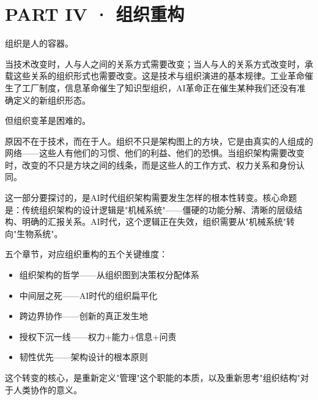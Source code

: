 \part{PART IV · 组织重构}



组织是人的容器。

当技术改变时，人与人之间的关系方式需要改变；当人与人的关系方式改变时，承载这些关系的组织形式也需要改变。这是技术与组织演进的基本规律。工业革命催生了工厂制度，信息革命催生了知识型组织，AI革命正在催生某种我们还没有准确定义的新组织形态。

但组织变革是困难的。

原因不在于技术，而在于人。组织不只是架构图上的方块，它是由真实的人组成的网络——这些人有他们的习惯、他们的利益、他们的恐惧。当组织架构需要改变时，改变的不只是方块之间的线条，而是这些人的工作方式、权力关系和身份认同。

这一部分要探讨的，是AI时代组织架构需要发生怎样的根本性转变。核心命题是：传统组织架构的设计逻辑是"机械系统"——僵硬的功能分解、清晰的层级结构、明确的汇报关系。AI时代，这个逻辑正在失效，组织需要从"机械系统"转向"生物系统"。

五个章节，对应组织重构的五个关键维度：
\begin{itemize}
\item 组织架构的哲学——从组织图到决策权分配体系
\item 中间层之死——AI时代的组织扁平化
\item 跨边界协作——创新的真正发生地
\item 授权下沉一线——权力+能力+信息+问责
\item 韧性优先——架构设计的根本原则

\end{itemize}
这个转变的核心，是重新定义"管理"这个职能的本质，以及重新思考"组织结构"对于人类协作的意义。
